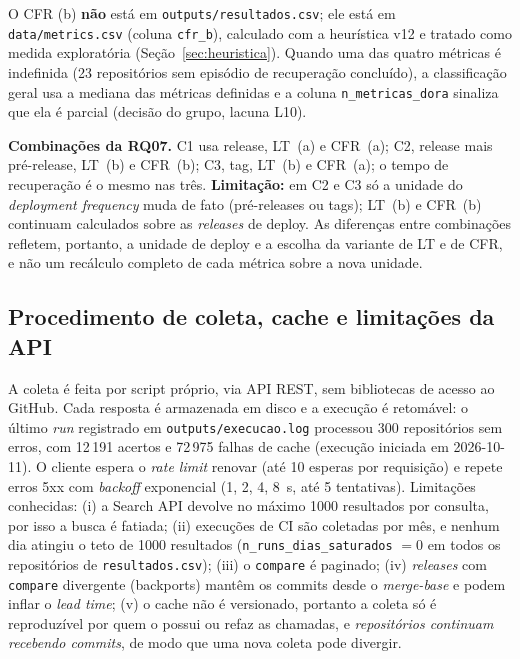 O CFR (b) \textbf{não} está em \texttt{outputs/resultados.csv}; ele está em \texttt{data/metrics.csv}
(coluna \texttt{cfr\_b}), calculado com a heurística v12 e tratado como medida exploratória
(Seção~\ref{sec:heuristica}). Quando uma das quatro métricas é indefinida (23 repositórios sem episódio
de recuperação concluído), a classificação geral usa a mediana das métricas definidas e a coluna
\texttt{n\_metricas\_dora} sinaliza que ela é parcial (decisão do grupo, lacuna L10).

\textbf{Combinações da RQ07.} C1 usa release, LT~(a) e CFR~(a); C2, release mais pré-release, LT~(b) e
CFR~(b); C3, tag, LT~(b) e CFR~(a); o tempo de recuperação é o mesmo nas três. \textbf{Limitação:} em C2 e C3
só a unidade do \textit{deployment frequency} muda de fato (pré-releases ou tags); LT~(b) e CFR~(b) continuam
calculados sobre as \textit{releases} de deploy. As diferenças entre combinações refletem, portanto, a
unidade de deploy e a escolha da variante de LT e de CFR, e não um recálculo completo de cada métrica sobre
a nova unidade.

\subsection{Procedimento de coleta, cache e limitações da API}
A coleta é feita por script próprio, via API REST, sem bibliotecas de acesso ao GitHub. Cada resposta é
armazenada em disco e a execução é retomável: o último \textit{run} registrado em
\texttt{outputs/execucao.log} processou 300 repositórios sem erros, com 12\,191 acertos e 72\,975 falhas de
cache (execução iniciada em 2026-10-11). O cliente espera o \textit{rate limit} renovar (até 10 esperas por
requisição) e repete erros 5xx com \textit{backoff} exponencial (1, 2, 4, 8~s, até 5 tentativas).
Limitações conhecidas: (i) a Search API devolve no máximo 1000 resultados por consulta, por isso a busca é
fatiada; (ii) execuções de CI são coletadas por mês, e nenhum dia atingiu o teto de 1000 resultados
(\texttt{n\_runs\_dias\_saturados} $=0$ em todos os repositórios de \texttt{resultados.csv}); (iii) o
\texttt{compare} é paginado; (iv) \textit{releases} com \texttt{compare} divergente (backports) mantêm
os commits desde o \textit{merge-base} e podem inflar o \textit{lead time}; (v) o cache não é versionado,
portanto a coleta só é reproduzível por quem o possui ou refaz as chamadas, e \emph{repositórios continuam
recebendo commits}, de modo que uma nova coleta pode divergir.

